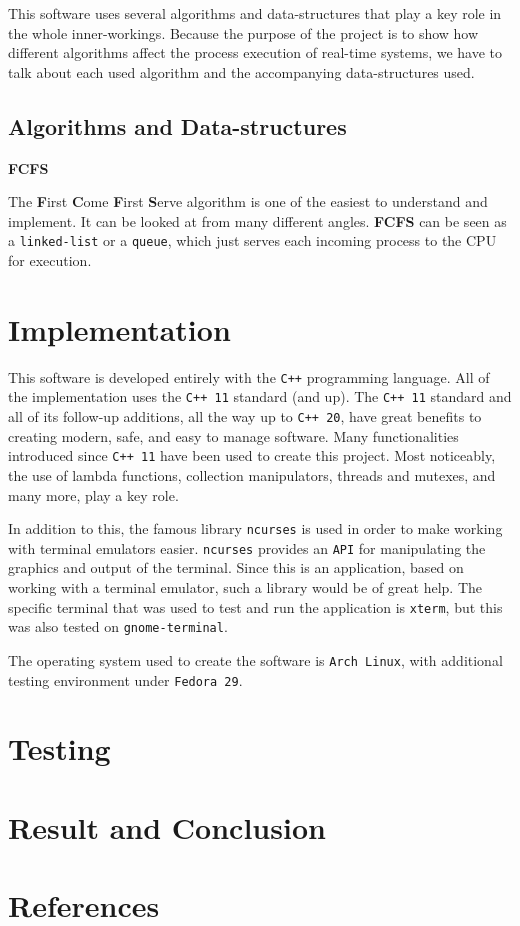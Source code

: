 \documentclass{article}
\newcommand{\code}[1]{\colorbox{codegray}{\texttt{#1}}}
\begin{document}
This software uses several algorithms and data-structures that play a key role in the whole inner-workings. Because the purpose of the project is to show how different algorithms affect the process execution of real-time systems, we have to talk about each used algorithm and the accompanying data-structures used.

\subsection{Algorithms and Data-structures}

\textbf{FCFS}

The \textbf{F}irst \textbf{C}ome \textbf{F}irst \textbf{S}erve algorithm is one of the easiest to understand and implement. It can be looked at from many different angles. \textbf{FCFS} can be seen as a \code{linked-list} or a \code{queue}, which just serves each incoming process to the CPU for execution.

\section{Implementation}

This software is developed entirely with the \code{C++} programming language. All of the implementation uses the \code{C++ 11} standard (and up). The \code{C++ 11} standard and all of its follow-up additions, all the way up to \code{C++ 20}, have great benefits to creating modern, safe, and easy to manage software. Many functionalities introduced since \code{C++ 11} have been used to create this project. Most noticeably, the use of lambda functions, collection manipulators, threads and mutexes, and many more, play a key role.

In addition to this, the famous library \code{ncurses} is used in order to make working with terminal emulators easier. \code{ncurses} provides an \code{API} for manipulating the graphics and output of the terminal. Since this is an application, based on working with a terminal emulator, such a library would be of great help. The specific terminal that was used to test and run the application is \code{xterm}, but this was also tested on \code{gnome-terminal}.

The operating system used to create the software is \code{Arch Linux}, with additional testing environment under \code{Fedora 29}.

\section{Testing}

\section{Result and Conclusion}

\section{References}
\end{document}
